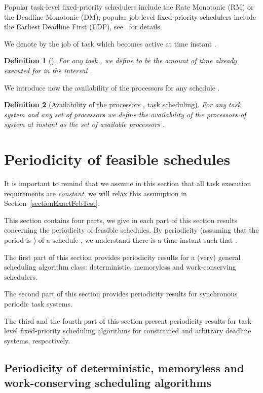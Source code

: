\documentclass[a4paper,11pt]{article}
\newcommand{\EDF}{\textrm{EDF}}
\newcommand{\RM}{\textrm{RM}}
\newcommand{\DM}{\textrm{DM}}
\newtheorem{Definition}{Definition}
\begin{document}
Popular task-level fixed-priority schedulers include the Rate Monotonic (\RM) or the Deadline Monotonic (\DM); popular job-level fixed-priority schedulers include the Earliest Deadline First (\EDF), see~\cite{Liu} for details.

We denote by  the   job of task  which
becomes active at time instant .

\begin{Definition}[]
  For any task , we define  to be the amount of
  time already executed for  in the interval .
\end{Definition}

We introduce now the availability of the processors for any schedule
.

\begin{Definition} [Availability of the processors , task scheduling]
\label{defAvai} For any task system  and any set of  processors
   we define the {\em availability of the processors}
   of system  at instant  as the set of available processors
   .
\end{Definition}

\section{Periodicity of feasible schedules}\label{sectionMainPer}

It is important to remind that we assume in this section that all task execution requirements are \emph{constant}, we will relax this assumption in Section~\ref{sectionExactFebTest}. 

This section contains four parts,  we give in each part of this section results concerning the periodicity of feasible schedules. By periodicity (assuming that the period is ) of a schedule , we understand there is a time instant  such that .

The first part of this section provides periodicity results for a
(very) general scheduling algorithm class: deterministic,
memoryless and work-conserving schedulers. 

The second part of this section provides periodicity results for
synchronous periodic task systems.

The third and the fourth part of this section present periodicity
results for task-level fixed-priority scheduling algorithms for constrained and arbitrary deadline systems, respectively. 

\subsection{Periodicity of deterministic, memoryless and
  work-conserving scheduling algorithms} \label{genGenSyst}
\end{document}
